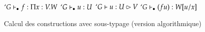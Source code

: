 \def\AppI{
\TAX{App}
{$`G \seq f : \Pi x : V. W $}
{$`G \seq u : U$}
{$`G \subt u : U \sub V $}
{$`G \seq (f u) : W [ u / x ]$}
{}
}

\begin{figure}[h]
  \begin{center}
    \def\fCenter{\wf}
    \def\type{\typei}
    
    \WfAtom\DP    
    \WfVar\DP
    
    \def\fCenter{\typei}
    \vspace{\infvspace}
    \PropSet\DP
    
    \vspace{\infvspace}
    \Var\DP
    
    \vspace{\infvspace}
    \Prod\DP
    
    \vspace{\infvspace}
    \Abs\DP

    \vspace{\infvspace}
    \AppI\DP

    \vspace{\infvspace}
    \LetIn\DP
    
    \vspace{\infvspace}
    \SigmaR\DP

    \vspace{\infvspace}
    \Sum\DP
    
    \vspace{\infvspace}
    \LetSum\DP
    
  \end{center}
  \label{typing-algo-rules}
  \caption{Calcul des constructions avec sous-typage (version algorithmique)}
\end{figure}

